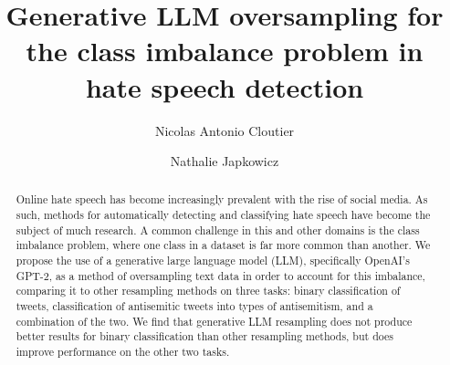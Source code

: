 \documentclass[runningheads]{llncs}
\begin{document}
\makeatletter
\renewcommand\section{\@startsection{section}{1}{\z@}%
                       {-10\p@}%
                       {8\p@ }%
                       {\normalfont\large\bfseries\boldmath
                        \rightskip=\z@ \@plus 8em\pretolerance=10000 }}
\renewcommand\subsection{\@startsection{subsection}{2}{\z@}%
                       {-9\p@ }%
                       {7\p@ }%
                       {\normalfont\normalsize\bfseries\boldmath
                        \rightskip=\z@ \@plus 8em\pretolerance=10000 }}
\renewcommand\subsubsection{\@startsection{subsubsection}{3}{\z@}%
                       {-5\p@ }%
                       {-2em }%
                       {\normalfont\normalsize\bfseries\boldmath}}
\makeatother

\setlength{\textfloatsep}{0pt plus 0pt minus 0pt}
\setlength{\intextsep}{0pt plus 0pt minus 0pt}
 \setlength{\parskip}{0pt plus 0pt minus 0pt}

\title{Generative LLM oversampling for the class imbalance problem in hate speech detection}
\author{Nicolas Antonio Cloutier \and Nathalie Japkowicz}



\maketitle 

\begin{abstract}
Online hate speech has become increasingly prevalent with the rise of social media. As such, methods for automatically detecting and classifying hate speech have become the subject of much research. A common challenge in this and other domains is the class imbalance problem, where one class in a dataset is far more common than another. We propose the use of a generative large language model (LLM), specifically OpenAI's GPT-2, as a method of oversampling text data in order to account for this imbalance, comparing it to other resampling methods on three tasks: binary classification of tweets, classification of antisemitic tweets into types of antisemitism, and a combination of the two. We find that generative LLM resampling does not produce better results for binary classification than other resampling methods, but does improve performance on the other two tasks.
\end{abstract}
\end{document}
